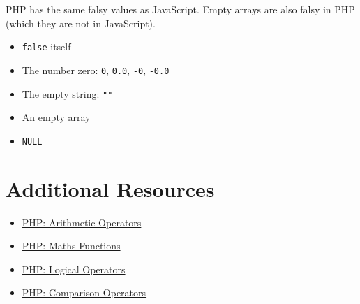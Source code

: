 PHP has the same falsy values as JavaScript. Empty arrays are also falsy in PHP (which they are not in JavaScript).

\begin{itemize}
    \item \texttt{false} itself
    \item The number zero: \texttt{0}, \texttt{0.0}, \texttt{-0}, \texttt{-0.0}
    \item The empty string: \texttt{""}
    \item An empty array
    \item \texttt{NULL}
\end{itemize}



\section{Additional Resources}

\begin{itemize}[leftmargin=*]
    \item \href{https://www.php.net/manual/en/language.operators.arithmetic.php}{PHP: Arithmetic Operators}
    \item \href{https://www.php.net/manual/en/ref.math.php}{PHP: Maths Functions}
    \item \href{http://php.net/manual/en/language.operators.logical.php}{PHP: Logical Operators}
    \item \href{http://php.net/manual/en/language.operators.comparison.php}{PHP: Comparison Operators}
\end{itemize}
